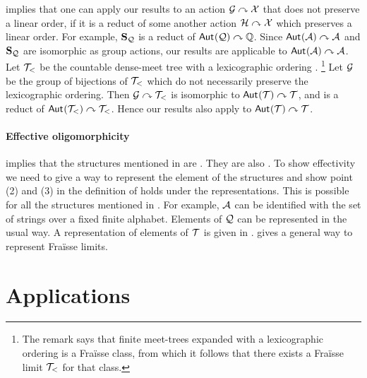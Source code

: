 \AP 
%
\begin{remark}\label{rem:reduct}
 implies that one can apply our results to an action $\mathcal{G}\curvearrowright\mathcal{X}$ that does not preserve a linear order,
if it is a reduct of some another action $\mathcal{H}\curvearrowright\mathcal{X}$ which preserves a linear order.
For example, $\mathbf{S}_{\mathcal{Q}}$ is a reduct of $\mathsf{Aut}_{}{(\mathcal{Q})}\curvearrowright\mathbb{Q}$.
Since $\mathsf{Aut}_{}{(\mathcal{A})}\curvearrowright\mathcal{A}$ and $\mathbf{S}_{\mathcal{Q}}$ are isomorphic as group actions,
our results are applicable to $\mathsf{Aut}_{}{(\mathcal{A})}\curvearrowright\mathcal{A}$.
Let $\mathcal{T}_<$ be the countable dense-meet tree with a lexicographic ordering \cite[Remark 6.14]{KRS21}.
\footnote{The remark says that finite meet-trees expanded with a lexicographic ordering is a Fra\"{i}sse class,
from which it follows that there exists a Fra\"{i}sse limit $\mathcal{T}_<$ for that class.}
Let $\mathcal{G}$ be the group of bijections of $\mathcal{T}_<$ which do not necessarily preserve the lexicographic ordering.
Then $\mathcal{G}\curvearrowright\mathcal{T}_<$ is isomorphic to $\mathsf{Aut}_{}{(\mathcal{T})}\curvearrowright\mathcal{T}$,
and is a reduct of $\mathsf{Aut}_{}{(\mathcal{T}_<)}\curvearrowright\mathcal{T}_<$.
Hence our results also apply to $\mathsf{Aut}_{}{(\mathcal{T})}\curvearrowright\mathcal{T}$.
\end{remark}
%
\paragraph{Effective oligomorphicity}
%
\cite[Theorem 7.6]{BOJAN16inf} implies that the structures mentioned in   are .
They are also .
To show effectivity we need to give a way to represent the element of the structures and show point (2) and (3) in the definition of  holds under the representations.
This is possible for all the structures mentioned in .
For example, $\mathcal{A}$ can be identified with the set of strings over a fixed finite alphabet.
Elements of $\mathcal{Q}$ can be represented in the usual way.
A representation of elements of $\mathcal{T}$ is given in \cite[Page 244-245]{BOJAN16inf}.
\cite{CompFraisse} gives a general way to represent Fra\"{i}sse limits.
%
\section{Applications}

